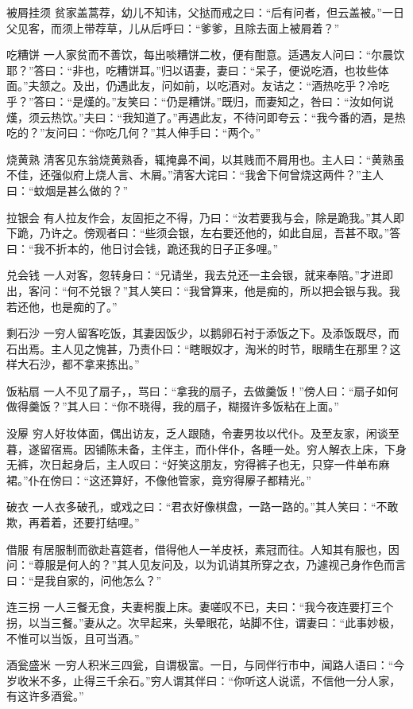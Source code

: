 \documentclass[12pt,UTF8]{ctexbook}
\begin{document}
被屑挂须
贫家盖蒿荐，幼儿不知讳，父挞而戒之曰：“后有问者，但云盖被。”一日父见客，而须上带荐草，儿从后呼曰：“爹爹，且除去面上被屑着？”

吃糟饼
一人家贫而不善饮，每出啖糟饼二枚，便有酣意。适遇友人问曰：“尔晨饮耶？”答曰：“非也，吃糟饼耳。”归以语妻，妻曰：“呆子，便说吃酒，也妆些体面。”夫颔之。及出，仍遇此友，问如前，以吃酒对。友诘之：“酒热吃乎？冷吃乎？”答曰：“是熯的。”友笑曰：“仍是糟饼。”既归，而妻知之，咎曰：“汝如何说熯，须云热饮。”夫曰：“我知道了。”再遇此友，不待问即夸云：“我今番的酒，是热吃的？”友问曰：“你吃几何？”其人伸手曰：“两个。”

烧黄熟
清客见东翁烧黄熟香，辄掩鼻不闻，以其贱而不屑用也。主人曰：“黄熟虽不佳，还强似府上烧人言、木屑。”清客大诧曰：“我舍下何曾烧这两件？”主人曰：“蚊烟是甚么做的？”

拉银会
有人拉友作会，友固拒之不得，乃曰：“汝若要我与会，除是跪我。”其人即下跪，乃许之。傍观者曰：“些须会银，左右要还他的，如此自屈，吾甚不取。”答曰：“我不折本的，他日讨会钱，跪还我的日子正多哩。”

兑会钱
一人对客，忽转身曰：“兄请坐，我去兑还一主会银，就来奉陪。”才进即出，客问：“何不兑银？”其人笑曰：“我曾算来，他是痴的，所以把会银与我。我若还他，也是痴的了。”

剩石沙
一穷人留客吃饭，其妻因饭少，以鹅卵石衬于添饭之下。及添饭既尽，而石出焉。主人见之愧甚，乃责仆曰：“瞎眼奴才，淘米的时节，眼睛生在那里？这样大石沙，都不拿来拣出。”

饭粘扇
一人不见了扇子，，骂曰：“拿我的扇子，去做羹饭！”傍人曰：“扇子如何做得羹饭？”其人曰：“你不晓得，我的扇子，糊掇许多饭粘在上面。”

没屪
穷人好妆体面，偶出访友，乏人跟随，令妻男妆以代仆。及至友家，闲谈至暮，遂留宿焉。因铺陈未备，主伴主，而仆伴仆，各睡一处。穷人解衣上床，下身无裤，次日起身后，主人叹曰：“好笑这朋友，穷得裤子也无，只穿一件单布麻裙。”仆在傍曰：“这还算好，不像他管家，竟穷得屪子都精光。”

破衣
一人衣多破孔，或戏之曰：“君衣好像棋盘，一路一路的。”其人笑曰：“不敢欺，再着着，还要打结哩。”

借服
有居服制而欲赴喜筵者，借得他人一羊皮袄，素冠而往。人知其有服也，因问：“尊服是何人的？”其人见友问及，以为讥诮其所穿之衣，乃遽视己身作色而言曰：“是我自家的，问他怎么？”

连三拐
一人三餐无食，夫妻枵腹上床。妻嗟叹不已，夫曰：“我今夜连要打三个拐，以当三餐。”妻从之。次早起来，头晕眼花，站脚不住，谓妻曰：“此事妙极，不惟可以当饭，且可当酒。”

酒瓮盛米
一穷人积米三四瓮，自谓极富。一日，与同伴行市中，闻路人语曰：“今岁收米不多，止得三千余石。”穷人谓其伴曰：“你听这人说谎，不信他一分人家，有这许多酒瓮。”
\end{document}
